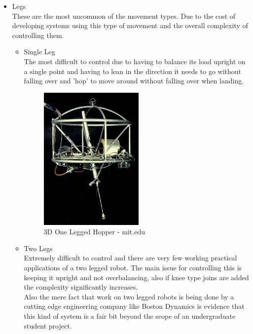 \begin{itemize}
\item Legs
\\These are the most uncommon of the movement types.  Due to the cost of developing systems using this type of movement and the overall complexity of controlling them.
	\begin{itemize}
	\item Single Leg
	\\The most difficult to control due to having to balance its load upright on a single point and having to lean in the direction it needs to go without falling over and 'hop' to move around without falling over when landing.
\begin{figure}[H]
\centering
        \includegraphics[width=2.0in] {Images/3d-hopper.jpeg}
        \caption{3D One Legged Hopper - mit.edu}
        \label{3D One Legged Hopper}
\end{figure}
	\item Two Legs
	\\Extremely difficult to control and there are very few working practical applications of a two legged robot.  The main issue for controlling this is keeping it upright and not overbalancing, also if knee type joins are added the complexity significantly increases.
	\\Also the mere fact that work on two legged robots is being done by a cutting edge engineering company like Boston Dynamics \cite{boston} is evidence that this kind of system is a fair bit beyond the scope of an undergraduate student project.


\end{itemize}
\end{itemize}
